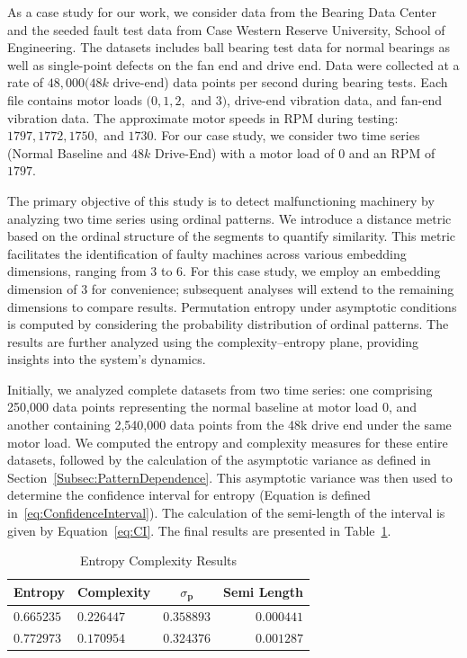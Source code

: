 As a case study for our work, we consider data from the Bearing Data Center and the seeded fault test data from Case Western Reserve University, School of Engineering. The datasets includes ball bearing test data for normal bearings as well as single-point defects on the fan end and drive end. Data were collected at a rate of $48,000 (48k$ drive-end) data points per second during bearing tests. Each file contains motor loads $(0, 1, 2,$ and $3)$, drive-end vibration data, and fan-end vibration data. The approximate motor speeds in RPM during testing: $1797, 1772, 1750,$ and $1730$. For our case study, we consider two time series (Normal Baseline and $48k$ Drive-End) with a motor load of $0$ and an RPM of $1797$. 

The primary objective of this study is to detect malfunctioning machinery by analyzing two time series using ordinal patterns. We introduce a distance metric based on the ordinal structure of the segments to quantify similarity. This metric facilitates the identification of faulty machines across various embedding dimensions, ranging from $3$ to $6$. For this case study, we employ an embedding dimension of $3$ for convenience; subsequent analyses will extend to the remaining dimensions to compare results. Permutation entropy under asymptotic conditions is computed by considering the probability distribution of ordinal patterns. The results are further analyzed using the complexity–entropy plane, providing insights into the system's dynamics.

Initially, we analyzed complete datasets from two time series: one comprising 250,000 data points representing the normal baseline at motor load 0, and another containing 2,540,000 data points from the 48k drive end under the same motor load. We computed the entropy and complexity measures for these entire datasets, followed by the calculation of the asymptotic variance as defined in Section~\ref{Subsec:PatternDependence}. This asymptotic variance was then used to determine the confidence interval for entropy (Equation is defined in~\ref{eq:ConfidenceInterval}). The calculation of the semi-length of the interval is given by Equation~\ref{eq:CI}. The final results are presented in Table~\ref{tab:EnComplexResults}.


\begin{table}[H]
	\centering
	\begin{tabular}{llcr}
		\toprule
		Entropy  & Complexity  & $\sigma_{\bm{p}}$ & Semi Length \\
		\midrule
		$0.665235$ & $0.226447$ & $0.358893$ & $0.000441$\\ 
		$0.772973$ & $0.170954$ & $0.324376$ & $0.001287$\\
		\bottomrule
	\end{tabular}
	\caption{Entropy Complexity Results}
	\label{tab:EnComplexResults}
\end{table}

